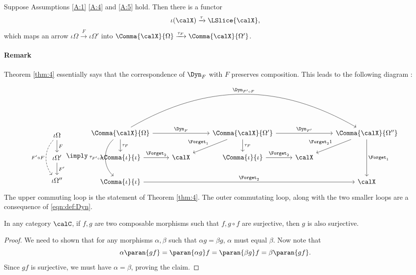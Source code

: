 \documentclass[12pt,oneside]{article}
\begin{document}
\begin{theorem} \label{thm:4}
	Suppose Assumptions \ref{A:1} \ref{A:4} and \ref{A:5} hold. Then there is a functor 
	\[ \iota(\calX) \xrightarrow{\tau} \LSlice{ \calX } , \]
	which maps an arrow $\iota \Omega \xrightarrow{F} \iota \Omega'$ into $\Comma{\calX}{\Omega} \xrightarrow{\tau_F} \Comma{\calX}{\Omega'}$.
\end{theorem}

\paragraph{Remark} Theorem \ref{thm:4} essentially says that the correspondence of $\Dyn_F$ with $F$ preserves composition. This leads to the following diagram :
%
\[ \begin{tikzcd} \iota \Omega \arrow[dashed,  bend right = 40]{dd}[swap]{F'\circ F} \arrow{d}{F} \\ \iota \Omega' \arrow{d}{F'} \\ \iota \Omega'' \end{tikzcd} \imply 
\begin{tikzcd}
	\Comma{\calX}{\Omega} \arrow[d, "\tau_F"] \arrow[rr, "\Dyn_F"] \arrow[dd, "\tau_{F'\circ F}"', bend right=49] \arrow[rrrr, "\Dyn_{F'\circ F}", bend left=30] & & \Comma{\calX}{\Omega'} \arrow[d, "\tau_F"] \arrow[ld, "\Forget_1"'] \arrow[rr, "\Dyn_{F'}"] & & \Comma{\calX}{\Omega''} \arrow[ld, "\Forget_21"'] \arrow[dd, "\Forget_1"] \\
	\Comma{\iota}{\iota} \arrow[r, "\Forget_2"] & \calX & \Comma{\iota}{\iota} \arrow[r, "\Forget_2"] & \calX & \\
	\Comma{\iota}{\iota} \arrow[rrrr, "\Forget_2"] & & & & \calX 
\end{tikzcd}\]
%
The upper commuting loop is the statement of Theorem \ref{thm:4}. The outer commutating loop, along with the two smaller loops are a consequence of \eqref{eqn:def:Dyn}.

\begin{lemma} \label{lem:surj_right_cancel}
	In any category $\calC$, if $f,g$ are two composable morphisms such that $f, g\circ f$ are surjective, then $g$ is also surjective.
\end{lemma} 

\begin{proof} We need to shown that for any morphisms $\alpha, \beta$ such that $\alpha g = \beta g$, $\alpha$ must equal $\beta$. Now note that
	\[ \alpha \paran{g f} = \paran{\alpha g} f = \paran{\beta g} f = \beta \paran{gf} . \]
	Since $gf$ is surjective, we must have $\alpha=\beta$, proving the claim. 
\end{proof}
\end{document}
